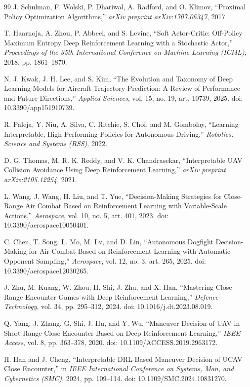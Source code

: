 \documentclass[drones,article,submit,pdftex,moreauthors]{Definitions/mdpi}
\begin{document}
\begin{thebibliography}{99}
J. Schulman, F. Wolski, P. Dhariwal, A. Radford, and O. Klimov,
``Proximal Policy Optimization Algorithms,''
\emph{arXiv preprint arXiv:1707.06347}, 2017.

T. Haarnoja, A. Zhou, P. Abbeel, and S. Levine,
``Soft Actor-Critic: Off-Policy Maximum Entropy Deep Reinforcement Learning with a Stochastic Actor,''
\emph{Proceedings of the 35th International Conference on Machine Learning (ICML)}, 2018, pp. 1861--1870.

N. J. Kwak, J. H. Lee, and S. Kim,
``The Evolution and Taxonomy of Deep Learning Models for Aircraft Trajectory Prediction: A Review of Performance and Future Directions,''
\emph{Applied Sciences}, vol. 15, no. 19, art. 10739, 2025.
doi: 10.3390/app151910739.

R. Paleja, Y. Niu, A. Silva, C. Ritchie, S. Choi, and M. Gombolay,
``Learning Interpretable, High-Performing Policies for Autonomous Driving,''
\emph{Robotics: Science and Systems (RSS)}, 2022.

D. G. Thomas, M. R. K. Reddy, and V. K. Chandrasekar,
``Interpretable UAV Collision Avoidance Using Deep Reinforcement Learning,''
\emph{arXiv preprint arXiv:2105.12254}, 2021.

L. Wang, J. Wang, H. Liu, and T. Yue,
``Decision-Making Strategies for Close-Range Air Combat Based on Reinforcement Learning with Variable-Scale Actions,''
\emph{Aerospace}, vol. 10, no. 5, art. 401, 2023.
doi: 10.3390/aerospace10050401.

C. Chen, T. Song, L. Mo, M. Lv, and D. Lin,
``Autonomous Dogfight Decision-Making for Air Combat Based on Reinforcement Learning with Automatic Opponent Sampling,''
\emph{Aerospace}, vol. 12, no. 3, art. 265, 2025.
doi: 10.3390/aerospace12030265.

J. Zhu, M. Kuang, W. Zhou, H. Shi, J. Zhu, and X. Han,
``Mastering Close-Range Encounter Games with Deep Reinforcement Learning,''
\emph{Defence Technology}, vol. 34, pp. 295--312, 2024.
doi: 10.1016/j.dt.2023.08.019.

Q. Yang, J. Zhang, G. Shi, J. Hu, and Y. Wu,
``Maneuver Decision of UAV in Short-Range Close Encounter Based on Deep Reinforcement Learning,''
\emph{IEEE Access}, vol. 8, pp. 363--378, 2020.
doi: 10.1109/ACCESS.2019.2963172.

H. Han and J. Cheng,
``Interpretable DRL-Based Maneuver Decision of UCAV Close Encounter,''
in \emph{IEEE International Conference on Systems, Man, and Cybernetics (SMC)}, 2024, pp. 109--114.
doi: 10.1109/SMC.2024.10831270.


\end{thebibliography}
\end{document}
